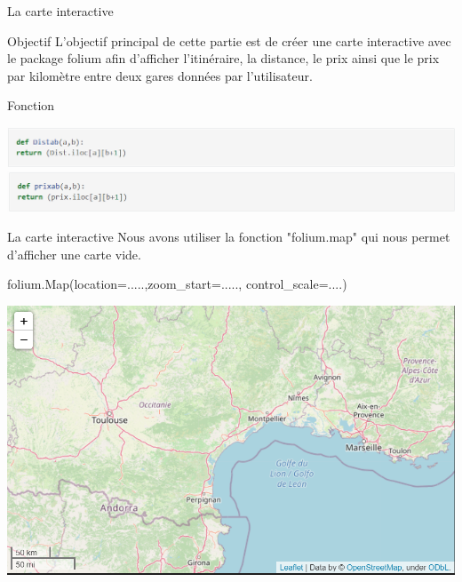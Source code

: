 \documentclass[aspectratio=169]{beamer}
\begin{document}

\begin{frame}{La carte interactive}

\begin{block}{Objectif}
 L’objectif principal de cette partie est de créer une carte interactive avec le package {\color{blue} folium} afin d’afficher l’itinéraire, la distance, le prix ainsi que le prix par kilomètre entre deux gares données par l’utilisateur.

\end{block}
\pause
\begin{block}{Fonction}

\includegraphics[scale=0.7]{1.png}
\includegraphics[scale=0.7]{2.png}

\end{block}
\end{frame}
\begin{frame}{La carte interactive}
Nous avons utiliser la fonction "folium.map" qui nous permet d'afficher une carte vide.
 \begin{block}{}
       {\color{blue}folium.Map(location=.....,zoom\_start=....., control\_scale=....)} 
 \end{block} 
 
 \begin{center}
  \includegraphics[scale=0.5]{Carte_vide.png}
 \end{center}
    
\end{frame}
\end{document}
